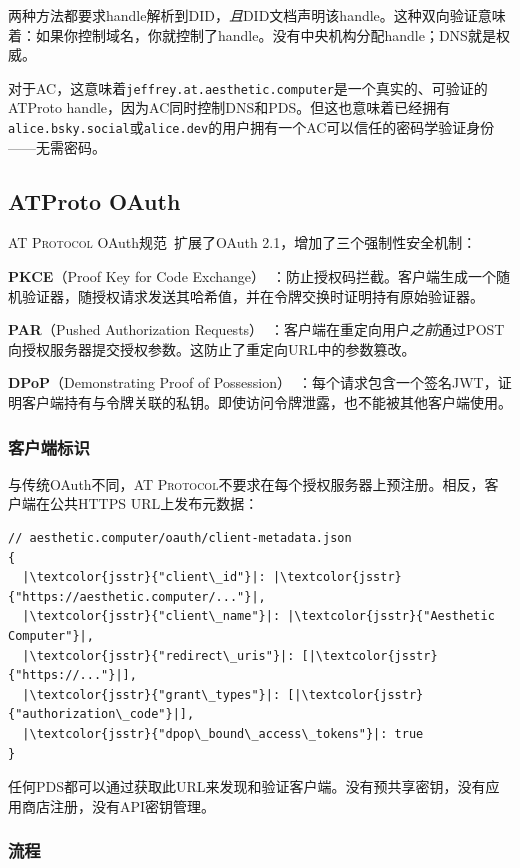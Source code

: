 \documentclass[10pt,letterpaper,twocolumn]{article}
\newcommand{\atproto}{\textsc{AT Protocol}}
\begin{document}
两种方法都要求handle解析到DID，\emph{且}DID文档声明该handle。这种双向验证意味着：如果你控制域名，你就控制了handle。没有中央机构分配handle；DNS就是权威。

对于AC，这意味着\texttt{jeffrey.at.aesthetic.computer}是一个真实的、可验证的ATProto handle，因为AC同时控制DNS和PDS。但这也意味着已经拥有\texttt{alice.bsky.social}或\texttt{alice.dev}的用户拥有一个AC可以信任的密码学验证身份——无需密码。

\subsection{ATProto OAuth}

\atproto{} OAuth规范~\citep{atproto2024oauth}扩展了OAuth 2.1，增加了三个强制性安全机制：

\textbf{PKCE}（Proof Key for Code Exchange）~\citep{rfc7636pkce}：防止授权码拦截。客户端生成一个随机验证器，随授权请求发送其哈希值，并在令牌交换时证明持有原始验证器。

\textbf{PAR}（Pushed Authorization Requests）~\citep{rfc9126par}：客户端在重定向用户\emph{之前}通过POST向授权服务器提交授权参数。这防止了重定向URL中的参数篡改。

\textbf{DPoP}（Demonstrating Proof of Possession）~\citep{rfc9449dpop}：每个请求包含一个签名JWT，证明客户端持有与令牌关联的私钥。即使访问令牌泄露，也不能被其他客户端使用。

\subsubsection{客户端标识}

与传统OAuth不同，\atproto{}不要求在每个授权服务器上预注册。相反，客户端在公共HTTPS URL上发布元数据：

\begin{lstlisting}[style=acjsstyle]
// aesthetic.computer/oauth/client-metadata.json
{
  |\textcolor{jsstr}{"client\_id"}|: |\textcolor{jsstr}{"https://aesthetic.computer/..."}|,
  |\textcolor{jsstr}{"client\_name"}|: |\textcolor{jsstr}{"Aesthetic Computer"}|,
  |\textcolor{jsstr}{"redirect\_uris"}|: [|\textcolor{jsstr}{"https://..."}|],
  |\textcolor{jsstr}{"grant\_types"}|: [|\textcolor{jsstr}{"authorization\_code"}|],
  |\textcolor{jsstr}{"dpop\_bound\_access\_tokens"}|: true
}
\end{lstlisting}

任何PDS都可以通过获取此URL来发现和验证客户端。没有预共享密钥，没有应用商店注册，没有API密钥管理。

\subsubsection{流程}
\end{document}
